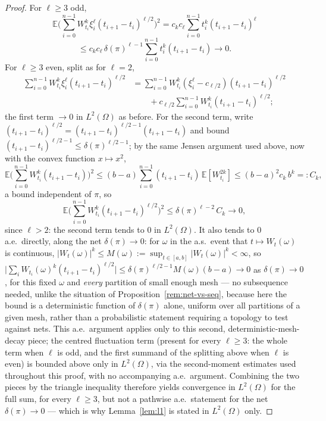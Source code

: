 \documentclass[11pt,fleqn]{article}
\def\E{\mathbb E}
\theoremstyle{plain}
\theoremstyle{remark}
\begin{document}
\begin{proof}
For $\ell\ge3$ odd,
\[
\E\Big(\sum_{i=0}^{n-1}W_{t_i}^k\xi_i^\ell(t_{i+1}-t_i)^{\ell/2}\Big)^2
=c_kc_\ell\sum_{i=0}^{n-1}t_i^k(t_{i+1}-t_i)^\ell
\]
\[
\le c_kc_\ell\,\delta(\pi)^{\ell-1}\sum_{i=0}^{n-1}t_i^k(t_{i+1}-t_i)\longrightarrow0.
\]
For $\ell\ge3$ even, split as for $\ell=2$,
\begin{align*}
\sum_{i=0}^{n-1}W_{t_i}^k\xi_i^\ell(t_{i+1}-t_i)^{\ell/2}
&=\sum_{i=0}^{n-1}W_{t_i}^k(\xi_i^\ell-c_{\ell/2})(t_{i+1}-t_i)^{\ell/2}\\
&\qquad+c_{\ell/2}\sum_{i=0}^{n-1}W_{t_i}^k(t_{i+1}-t_i)^{\ell/2};
\end{align*}
the first term $\to0$ in $L^2(\Omega)$ as before. For the second term,
write $(t_{i+1}-t_i)^{\ell/2}=(t_{i+1}-t_i)^{\ell/2-1}(t_{i+1}-t_i)$ and
bound $(t_{i+1}-t_i)^{\ell/2-1}\le\delta(\pi)^{\ell/2-1}$; by the same
Jensen argument used above, now with the convex function $x\mapsto x^2$,
\[
\E\Big(\sum_{i=0}^{n-1}W_{t_i}^k(t_{i+1}-t_i)\Big)^2
\le(b-a)\sum_{i=0}^{n-1}(t_{i+1}-t_i)\,\E[W_{t_i}^{2k}]
\le(b-a)^2c_k\,b^k=:C_k,
\]
a bound independent of $\pi$, so
\[
\E\Big(\sum_{i=0}^{n-1}W_{t_i}^k(t_{i+1}-t_i)^{\ell/2}\Big)^2
\le\delta(\pi)^{\ell-2}\,C_k\longrightarrow0,
\]
since $\ell>2$: the second term tends to $0$ in $L^2(\Omega)$. It also
tends to $0$ a.e.\ directly, along the net $\delta(\pi)\to0$: for
$\omega$ in the a.s.\ event that $t\mapsto W_t(\omega)$ is continuous,
$|W_t(\omega)|^k\le M(\omega):=\sup_{t\in[a,b]}|W_t(\omega)|^k<\infty$,
so $\big|\sum_iW_{t_i}(\omega)^k(t_{i+1}-t_i)^{\ell/2}\big|
\le\delta(\pi)^{\ell/2-1}M(\omega)(b-a)\to0$ as $\delta(\pi)\to0$, for
this fixed $\omega$ and \emph{every} partition of small enough mesh ---
no subsequence needed, unlike the situation of
Proposition~\ref{rem:net-vs-seq}, because here the bound is a deterministic
function of $\delta(\pi)$ alone, uniform over all partitions of a given
mesh, rather than a probabilistic statement requiring a topology to test
against nets. This a.e.\ argument applies only to this second,
deterministic-mesh-decay piece; the centred fluctuation term (present for
every $\ell\ge3$: the whole term when $\ell$ is odd, and the first
summand of the splitting above when $\ell$ is even) is bounded above only
in $L^2(\Omega)$, via the second-moment estimates used throughout this
proof, with no accompanying a.e.\ argument. Combining the two pieces by
the triangle inequality therefore yields convergence in $L^2(\Omega)$
for the full sum, for every $\ell\ge3$, but not a pathwise a.e.\
statement for the net $\delta(\pi)\to0$ --- which is why
Lemma~\ref{lem:l1} is stated in $L^2(\Omega)$ only.
\end{proof}
\end{document}
